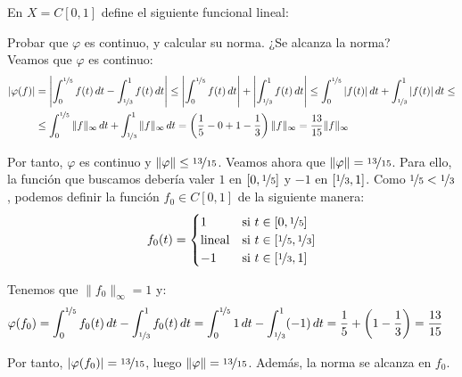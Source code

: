 \documentclass[12pt]{article}
\begin{document}
\begin{ejercicio}[2.5 puntos]
    En $X=C[0,1]$ define el siguiente funcional lineal:

    Probar que $\varphi$ es continuo, y calcular su norma. ¿Se alcanza la norma?\\

    Veamos que $\varphi$ es continuo:
    \begin{align*}
        |\varphi(f)| &= \left|\int_{0}^{\nicefrac{1}{5}} f(t)\,dt - \int_{\nicefrac{1}{3}}^{1} f(t)\,dt\right| \leq \left|\int_{0}^{\nicefrac{1}{5}} f(t)\,dt\right| + \left|\int_{\nicefrac{1}{3}}^{1} f(t)\,dt\right|
        \leq \int_{0}^{\nicefrac{1}{5}} |f(t)|\,dt + \int_{\nicefrac{1}{3}}^{1} |f(t)|\,dt \leq\\ &\leq \int_{0}^{\nicefrac{1}{5}} \|f\|_\infty\,dt + \int_{\nicefrac{1}{3}}^{1} \|f\|_\infty\,dt = \left(\frac{1}{5} - 0 + 1 - \frac{1}{3}\right) \|f\|_\infty = \frac{13}{15} \|f\|_\infty
    \end{align*}

    Por tanto, $\varphi$ es continuo y $\|\varphi\| \leq \nicefrac{13}{15}$. Veamos ahora que $\|\varphi\| = \nicefrac{13}{15}$. Para ello, la función que buscamos debería valer $1$ en $[0, \nicefrac{1}{5}]$ y $-1$ en $[\nicefrac{1}{3}, 1]$. Como $\nicefrac{1}{5} < \nicefrac{1}{3}$, podemos definir la función $f_0 \in C[0,1]$ de la siguiente manera:
    \begin{equation*}
        f_0(t) = \begin{cases}
            1 & \text{si } t \in [0, \nicefrac{1}{5}]\\
            \text{lineal} & \text{si } t \in [\nicefrac{1}{5}, \nicefrac{1}{3}]\\
            -1 & \text{si } t \in [\nicefrac{1}{3}, 1]
        \end{cases}
    \end{equation*}

    Tenemos que $\|f_0\|_\infty = 1$ y:
    \begin{align*}
        \varphi(f_0) &= \int_{0}^{\nicefrac{1}{5}} f_0(t)\,dt - \int_{\nicefrac{1}{3}}^{1} f_0(t)\,dt = \int_{0}^{\nicefrac{1}{5}} 1\,dt - \int_{\nicefrac{1}{3}}^{1} (-1)\,dt = \frac{1}{5} + \left(1 - \frac{1}{3}\right) = \frac{13}{15}
    \end{align*}

    Por tanto, $|\varphi(f_0)| = \nicefrac{13}{15}$, luego $\|\varphi\| = \nicefrac{13}{15}$. Además, la norma se alcanza en $f_0$.
\end{ejercicio}
\end{document}
